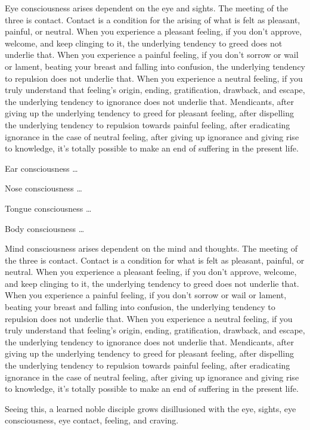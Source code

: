 \documentclass[12pt,openany]{book}%
\begin{document}
Eye consciousness arises dependent on the eye and sights. The meeting of the three is contact. Contact is a condition for the arising of what is felt as pleasant, painful, or neutral. When you experience a pleasant feeling, if you don’t approve, welcome, and keep clinging to it, the underlying tendency to greed does not underlie that. When you experience a painful feeling, if you don’t sorrow or wail or lament, beating your breast and falling into confusion, the underlying tendency to repulsion does not underlie that. When you experience a neutral feeling, if you truly understand that feeling’s origin, ending, gratification, drawback, and escape, the underlying tendency to ignorance does not underlie that. Mendicants, after giving up the underlying tendency to greed for pleasant feeling, after dispelling the underlying tendency to repulsion towards painful feeling, after eradicating ignorance in the case of neutral feeling, after giving up ignorance and giving rise to knowledge, it’s totally possible to make an end of suffering in the present life. 

Ear consciousness … 

Nose consciousness … 

Tongue consciousness … 

Body consciousness … 

Mind consciousness arises dependent on the mind and thoughts. The meeting of the three is contact. Contact is a condition for what is felt as pleasant, painful, or neutral. When you experience a pleasant feeling, if you don’t approve, welcome, and keep clinging to it, the underlying tendency to greed does not underlie that. When you experience a painful feeling, if you don’t sorrow or wail or lament, beating your breast and falling into confusion, the underlying tendency to repulsion does not underlie that. When you experience a neutral feeling, if you truly understand that feeling’s origin, ending, gratification, drawback, and escape, the underlying tendency to ignorance does not underlie that. Mendicants, after giving up the underlying tendency to greed for pleasant feeling, after dispelling the underlying tendency to repulsion towards painful feeling, after eradicating ignorance in the case of neutral feeling, after giving up ignorance and giving rise to knowledge, it’s totally possible to make an end of suffering in the present life. 

Seeing this, a learned noble disciple grows disillusioned with the eye, sights, eye consciousness, eye contact, feeling, and craving. 
\end{document}
